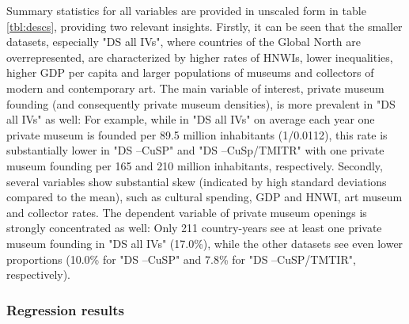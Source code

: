 \documentclass[11pt]{article}
\begin{document}
Summary statistics for all variables are provided in unscaled form in table \ref{tbl:descs}, providing two relevant insights. 
Firstly, it can be seen that the smaller datasets, especially "DS all IVs", where countries of the Global North are overrepresented, are characterized by higher rates of HNWIs, lower inequalities, higher GDP per capita and larger populations of museums and collectors of modern and contemporary art.
The main variable of interest, private museum founding (and consequently private museum densities), is more prevalent in "DS all IVs" as well: 
For example, while in "DS all IVs" on average each year one private museum is founded per 89.5 million inhabitants (1/0.0112), this rate is substantially lower in "DS --CuSP" and "DS --CuSp/TMITR" with one private museum founding per 165 and 210 million inhabitants, respectively.
Secondly, several variables show substantial skew (indicated by high standard deviations compared to the mean), such as cultural spending, GDP and HNWI, art museum and collector rates. 
The dependent variable of private museum openings is strongly concentrated as well: 
Only 211 country-years see at least one private museum founding in "DS all IVs" (17.0\%), while the other datasets see even lower proportions (10.0\% for "DS --CuSP" and 7.8\% for "DS --CuSP/TMTIR", respectively).




\FloatBarrier

\subsubsection*{Regression results}
\end{document}
